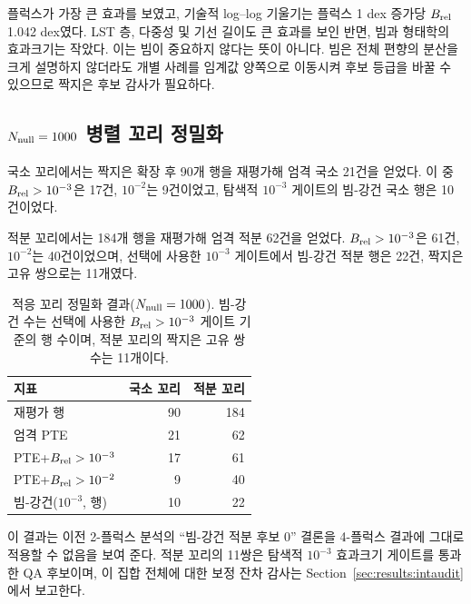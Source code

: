 \documentclass[final,5p,times]{elsarticle}
\newcommand{\AnovaFluxSlope}{1.042}
\newcommand{\NLocalTailRows}{90}
\newcommand{\NLocalTailStrict}{21}
\newcommand{\NLocalTailPhysEthree}{17}
\newcommand{\NLocalTailPhysEtwo}{9}
\newcommand{\NLocalTailBeamRobustEthree}{10}
\newcommand{\NIntTailRows}{184}
\newcommand{\NIntTailStrict}{62}
\newcommand{\NIntTailPhysEthree}{61}
\newcommand{\NIntTailPhysEtwo}{40}
\newcommand{\NIntTailBeamRobustEthree}{22}
\newcommand{\NIntAuditPairs}{11}
\begin{document}
플럭스가 가장 큰 효과를 보였고, 기술적 log--log 기울기는 플럭스
1 dex 증가당 $B_{\rm rel}$ \AnovaFluxSlope{} dex였다. LST 층,
다중성 및 기선 길이도 큰 효과를 보인 반면, 빔과 형태학의 효과크기는
작았다. 이는 빔이 중요하지 않다는 뜻이 아니다. 빔은 전체 편향의
분산을 크게 설명하지 않더라도 개별 사례를 임계값 양쪽으로 이동시켜
후보 등급을 바꿀 수 있으므로 짝지은 후보 감사가 필요하다.

\subsection{$N_{\rm null}=1000$ 병렬 꼬리 정밀화}
\label{sec:results:tail}

국소 꼬리에서는 짝지은 확장 후 \NLocalTailRows{}개 행을 재평가해
엄격 국소 \NLocalTailStrict{}건을 얻었다. 이 중
$B_{\rm rel}>10^{-3}$은 \NLocalTailPhysEthree{}건,
$10^{-2}$는 \NLocalTailPhysEtwo{}건이었고, 탐색적
$10^{-3}$ 게이트의 빔-강건 국소 행은
\NLocalTailBeamRobustEthree{}건이었다.

적분 꼬리에서는 \NIntTailRows{}개 행을 재평가해 엄격 적분
\NIntTailStrict{}건을 얻었다. $B_{\rm rel}>10^{-3}$은
\NIntTailPhysEthree{}건, $10^{-2}$는 \NIntTailPhysEtwo{}건이었으며,
선택에 사용한 $10^{-3}$ 게이트에서 빔-강건 적분 행은
\NIntTailBeamRobustEthree{}건, 짝지은 고유 쌍으로는
\NIntAuditPairs{}개였다.

\begin{table}[!t]
\centering
\small
\caption{적응 꼬리 정밀화 결과($N_{\rm null}=1000$). 빔-강건 수는
선택에 사용한 $B_{\rm rel}>10^{-3}$ 게이트 기준의 행 수이며, 적분
꼬리의 짝지은 고유 쌍 수는 \NIntAuditPairs{}개이다.}
\label{tab:tail}
\begin{tabular}{lrr}
\toprule
지표 & 국소 꼬리 & 적분 꼬리 \\
\midrule
재평가 행 & \NLocalTailRows & \NIntTailRows \\
엄격 PTE & \NLocalTailStrict & \NIntTailStrict \\
PTE+$B_{\rm rel}>10^{-3}$ & \NLocalTailPhysEthree & \NIntTailPhysEthree \\
PTE+$B_{\rm rel}>10^{-2}$ & \NLocalTailPhysEtwo & \NIntTailPhysEtwo \\
빔-강건($10^{-3}$, 행) & \NLocalTailBeamRobustEthree & \NIntTailBeamRobustEthree \\
\bottomrule
\end{tabular}
\end{table}

이 결과는 이전 2-플럭스 분석의 ``빔-강건 적분 후보 0'' 결론을
4-플럭스 결과에 그대로 적용할 수 없음을 보여 준다. 적분 꼬리의
\NIntAuditPairs{}쌍은 탐색적 $10^{-3}$ 효과크기 게이트를 통과한
QA 후보이며, 이 집합 전체에 대한 보정 잔차 감사는
Section~\ref{sec:results:intaudit}에서 보고한다.
\end{document}

